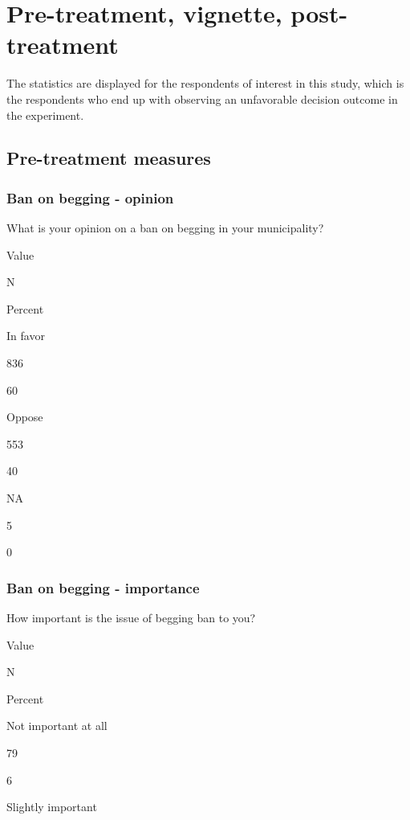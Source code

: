 \documentclass[
]{book}
\begin{document}
\hypertarget{pre-treatment-vignette-post-treatment-1}{%
\chapter{Pre-treatment, vignette,
post-treatment}\label{pre-treatment-vignette-post-treatment-1}}

The statistics are displayed for the respondents of interest in this
study, which is the respondents who end up with observing an unfavorable
decision outcome in the experiment.

\hypertarget{pre-treatment-measures-2}{%
\section{Pre-treatment measures}\label{pre-treatment-measures-2}}

\hypertarget{ban-on-begging---opinion-2}{%
\subsection{Ban on begging - opinion}\label{ban-on-begging---opinion-2}}

What is your opinion on a ban on begging in your municipality?

Value

N

Percent

In favor

836

60

Oppose

553

40

NA

5

0

\hypertarget{ban-on-begging---importance-2}{%
\subsection{Ban on begging -
importance}\label{ban-on-begging---importance-2}}

How important is the issue of begging ban to you?

Value

N

Percent

Not important at all

79

6

Slightly important
\end{document}
